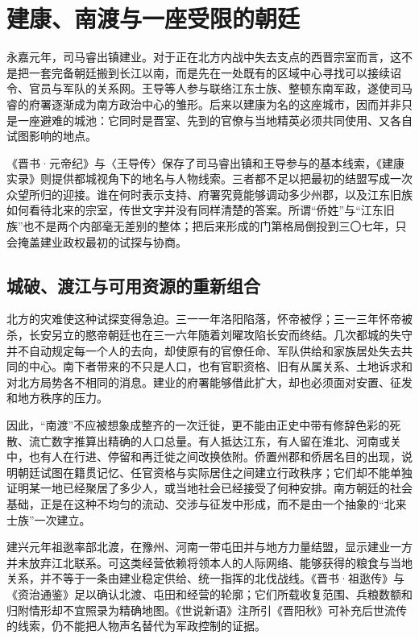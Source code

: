\section{建康、南渡与一座受限的朝廷}
\label{sec:eastern-jin-establishment-southern-society}

永嘉元年，司马睿出镇建业。对于正在北方内战中失去支点的西晋宗室而言，这不是把一套完备朝廷搬到长江以南，而是先在一处既有的区域中心寻找可以接续诏令、官员与军队的关系网。王导等人参与联络江东士族、整顿东南军政，遂使司马睿的府署逐渐成为南方政治中心的雏形。后来以建康为名的这座城市，因而并非只是一座避难的城池：它同时是晋室、先到的官僚与当地精英必须共同使用、又各自试图影响的地点。

《晋书·元帝纪》与〈王导传〉保存了司马睿出镇和王导参与的基本线索，《建康实录》则提供都城视角下的地名与人物线索。三者都不足以把最初的结盟写成一次众望所归的迎接。谁在何时表示支持、府署究竟能够调动多少州郡，以及江东旧族如何看待北来的宗室，传世文字并没有同样清楚的答案。所谓“侨姓”与“江东旧族”也不是两个内部毫无差别的整体；把后来形成的门第格局倒投到三〇七年，只会掩盖建业政权最初的试探与协商。

\subsection{城破、渡江与可用资源的重新组合}

北方的灾难使这种试探变得急迫。三一一年洛阳陷落，怀帝被俘；三一三年怀帝被杀，长安另立的愍帝朝廷也在三一六年随着刘曜攻陷长安而终结。几次都城的失守并不自动规定每一个人的去向，却使原有的官僚任命、军队供给和家族居处失去共同的中心。南下者带来的不只是人口，也有官职资格、旧有从属关系、土地诉求和对北方局势各不相同的消息。建业的府署能够借此扩大，却也必须面对安置、征发和地方秩序的压力。

因此，“南渡”不应被想象成整齐的一次迁徙，更不能由正史中带有修辞色彩的死散、流亡数字推算出精确的人口总量。有人抵达江东，有人留在淮北、河南或关中，也有人在行进、停留和再迁徙之间改换依附。侨置州郡和侨居名目的出现，说明朝廷试图在籍贯记忆、任官资格与实际居住之间建立行政秩序；它们却不能单独证明某一地已经聚居了多少人，或当地社会已经接受了何种安排。南方朝廷的社会基础，正是在这种不均匀的流动、交涉与征发中形成，而不是由一个抽象的“北来士族”一次建立。

建兴元年祖逖率部北渡，在豫州、河南一带屯田并与地方力量结盟，显示建业一方并未放弃江北联系。可这类经营依赖将领本人的人际网络、能够获得的粮食与当地关系，并不等于一条由建业稳定供给、统一指挥的北伐战线。《晋书·祖逖传》与《资治通鉴》足以确认北渡、屯田和经营的轮廓；它们所载收复范围、兵粮数额和归附情形却不宜照录为精确地图。《世说新语》注所引《晋阳秋》可补充后世流传的线索，仍不能把人物声名替代为军政控制的证据。

